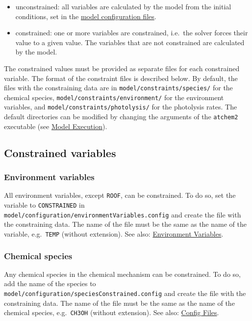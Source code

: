 \begin{itemize}
\item unconstrained: all variables are calculated by the model from
  the initial conditions, set in the \hyperref[sec:config]{model
    configuration files}.
\item constrained: one or more variables are constrained, i.e.~the
  solver forces their value to a given value. The variables that are
  not constrained are calculated by the model.
\end{itemize}

The constrained values must be provided as separate files for each
constrained variable. The format of the constraint files is described
below. By default, the files with the constraining data are in
\texttt{model/constraints/species/} for the chemical species,
\texttt{model/constraints/environment/} for the environment variables,
and \texttt{model/constraints/photolysis/} for the photolysis
rates. The default directories can be modified by changing the
arguments of the \texttt{atchem2} executable (see
\hyperref[subsec:execution]{Model Execution}).

\subsection{Constrained variables} \label{subsec:constrained-variables}

\subsubsection{Environment variables} \label{environment-variables}

All environment variables, except \texttt{ROOF}, can be
constrained. To do so, set the variable to \texttt{CONSTRAINED} in
\texttt{model/configuration/environmentVariables.config} and create
the file with the constraining data. The name of the file must be the
same as the name of the variable, e.g.~\texttt{TEMP} (without
extension). See also: \hyperref[sec:envvar]{Environment Variables}.

\subsubsection{Chemical species} \label{chemical-species}

Any chemical species in the chemical mechanism can be constrained. To
do so, add the name of the species to
\texttt{model/configuration/speciesConstrained.config} and create the
file with the constraining data. The name of the file must be the same
as the name of the chemical species, e.g.~\texttt{CH3OH} (without
extension). See also: \hyperref[sec:config]{Config Files}.

